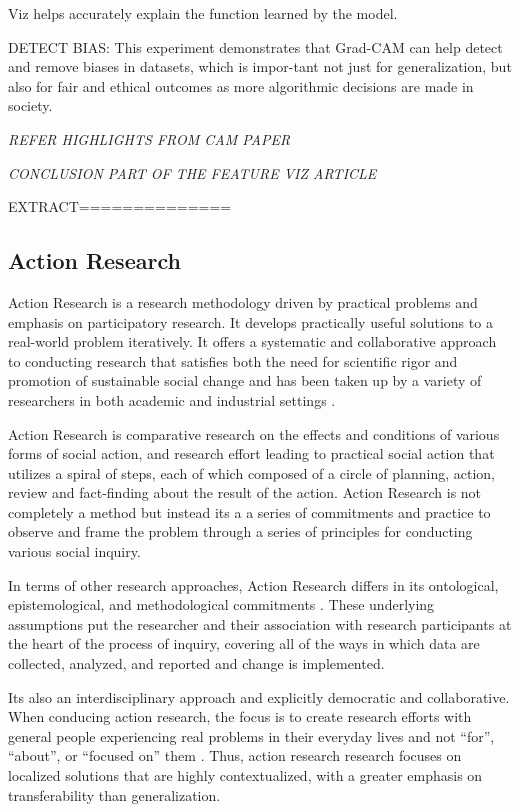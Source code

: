 Viz helps accurately explain the function learned by the model.

DETECT BIAS: This experiment demonstrates that Grad-CAM can
help detect and remove biases in datasets, which is impor-tant not just for generalization, but also for fair and ethical
outcomes as more algorithmic decisions are made in society.

\textit{REFER HIGHLIGHTS FROM CAM PAPER}

\textit{CONCLUSION PART OF THE FEATURE VIZ ARTICLE}

EXTRACT==============


\subsection{Action Research}
Action Research is a research methodology driven by practical problems and emphasis on participatory research. It develops practically useful solutions to a real-world problem iteratively. It offers a systematic and collaborative approach to conducting research that satisfies both the need for scientific rigor and promotion of sustainable social change and has been taken up by a variety of researchers in both academic and industrial settings \cite{Hayes:2011:RAR:1993060.1993065}.

Action Research is comparative research on the effects and conditions of various forms of social action, and research effort leading to practical social action that utilizes a spiral of steps, each of which composed of a circle of planning, action, review and fact-finding about the result of the action\cite{Hayes:2011:RAR:1993060.1993065}. Action Research is not completely a method but instead its a a series of commitments and practice to observe and frame the problem through a series of principles for conducting various social inquiry.

In terms of other research approaches, Action Research differs in its ontological, epistemological, and methodological commitments \cite{edsjsr.312187519970101}. These underlying assumptions put the researcher and their association with research participants at the heart of the process of inquiry, covering all of the ways in which data are collected, analyzed, and reported and change is implemented.

Its also an interdisciplinary approach and explicitly democratic and collaborative. When conducing action research, the focus is to create research efforts with general people experiencing real problems in their everyday lives and not “for”, “about”, or “focused on” them \cite{Hayes:2011:RAR:1993060.1993065}. Thus, action research research focuses on localized solutions that are highly contextualized, with a greater emphasis on transferability than generalization. 

